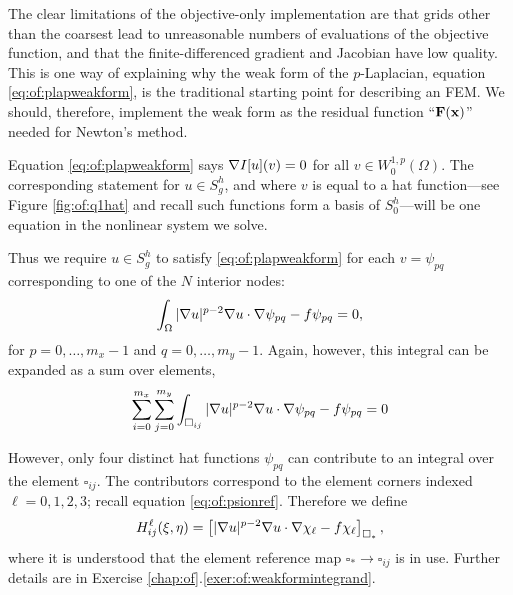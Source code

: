 The clear limitations of the objective-only implementation are that grids other than the coarsest lead to unreasonable numbers of evaluations of the objective function, and that the finite-differenced gradient and Jacobian have low quality.  This is one way of explaining why the weak form of the $p$-Laplacian, equation \eqref{eq:of:plapweakform}, is the traditional starting point for describing an FEM.  We should, therefore, implement the weak form as the residual function ``$\mathbf{F}(\mathbf{x})$'' needed for Newton's method.

Equation \eqref{eq:of:plapweakform} says $\nabla I[u](v) = 0$ for all $v\in W_0^{1,p}(\Omega)$.  The corresponding statement for $u\in S_g^h$, and where $v$ is equal to a hat function---see Figure \ref{fig:of:q1hat} and recall such functions form a basis of $S_0^h$---will be one equation in the nonlinear system we solve.

Thus we require $u\in S_g^h$ to satisfy \eqref{eq:of:plapweakform} for each $v=\psi_{pq}$ corresponding to one of the $N$ interior nodes:
\begin{equation}
\int_\Omega |\nabla u|^{p-2} \nabla u \cdot \nabla \psi_{pq} - f \psi_{pq} = 0, \label{eq:of:weakformbasis}
\end{equation}
for $p=0,\dots,m_x-1$ and $q=0,\dots,m_y-1$.  Again, however, this integral can be expanded as a sum over elements,
\begin{equation}
\sum_{i=0}^{m_x} \sum_{j=0}^{m_y} \int_{\square_{ij}} |\nabla u|^{p-2} \nabla u \cdot \nabla \psi_{pq} - f \psi_{pq} = 0 \label{eq:of:residualsumoverelements}
\end{equation}


However, only four distinct hat functions $\psi_{pq}$ can contribute to an integral over the element $\square_{ij}$.  The contributors correspond to the element corners indexed $\ell=0,1,2,3$; recall equation \eqref{eq:of:psionref}.  Therefore we define
\begin{equation}
H_{ij}^\ell(\xi,\eta) = \left[|\nabla u|^{p-2} \nabla u \cdot \nabla \chi_\ell - f \chi_\ell\right]_{\square_\ast}, \label{eq:of:weakformintegrandref}
\end{equation}
where it is understood that the element reference map $\square_\ast \to \square_{ij}$ is in use.  Further details are in Exercise \ref{chap:of}.\ref{exer:of:weakformintegrand}.

